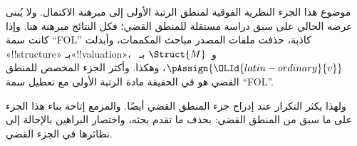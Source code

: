 \documentclass[../../include/open-logic-part]{subfiles}
\begin{document}

\begin{editorial}
  موضوع هذا الجزء النظرية الفوقية لمنطق الرتبة الأولى إلى مبرهنة
  الاكتمال. ولا يُبنى عرضه الحالي على سبق دراسة مستقلة للمنطق القضي؛
  فكل النتائج مبرهنة هنا. وإذا كانت سمة ``FOL'' كاذبة، حذفت ملفات
  المصدر مباحث المكممات، وأبدلت «!!{structure}» بـ«!!{valuation}»،
  و~$\Struct{M}$ بـ~$\pAssign{{\OLId{latin-ordinary}{v}}}$، وهكذا. وأكثر الجزء المخصص
  للمنطق القضي هو في الحقيقة مادة الرتبة الأولى مع تعطيل سمة
  ``FOL''.

  ولهذا يكثر التكرار عند إدراج جزء المنطق القضي أيضًا. والمزمع إتاحة
  بناء هذا الجزء على ما سبق من المنطق القضي: بحذف ما تقدم بحثه،
  واختصار البراهين بالإحالة إلى نظائرها في الجزء القضي.
\end{editorial}












\OLEndPartHook
\end{document}
